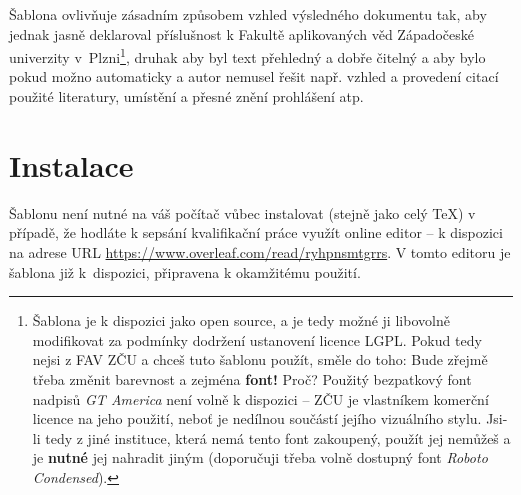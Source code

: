 \documentclass[czech, bc, kiv, he, iso690alph]{fasthesis}
\begin{document}
Šablona ovlivňuje zásadním způsobem vzhled výsledného dokumentu tak, aby jednak jasně deklaroval příslušnost k Fakultě aplikovaných věd Západočeské univerzity v~Plzni\footnote{Šablona je k dispozici jako open source, a je tedy možné ji libovolně modifikovat za podmínky dodržení ustanovení licence LGPL. Pokud tedy nejsi z FAV ZČU a chceš tuto šablonu použít, směle do toho: Bude zřejmě třeba změnit barevnost a zejména \textbf{font!} Proč? Použitý bezpatkový font nadpisů \emph{GT America} není volně k dispozici -- ZČU je vlastníkem komerční licence na jeho použití, neboť je nedílnou součástí jejího vizuálního stylu. Jsi-li tedy z jiné instituce, která nemá tento font zakoupený, použít jej nemůžeš a je \textbf{nutné} jej nahradit jiným (doporučuji třeba volně dostupný font \emph{Roboto Condensed}).}, druhak aby byl text přehledný a dobře čitelný a aby bylo pokud možno  automaticky a autor nemusel řešit např. vzhled a provedení citací použité literatury, umístění a přesné znění prohlášení atp.
%
%
%
\section{Instalace}
Šablonu není nutné  na váš počítač vůbec instalovat (stejně jako celý \TeX) v případě, že hodláte k sepsání kvalifikační práce využít online editor  -- k dispozici na adrese URL \url{https://www.overleaf.com/read/ryhpnsmtgrrs}. V tomto editoru je šablona již k~dispozici, připravena k okamžitému použití.
\end{document}
